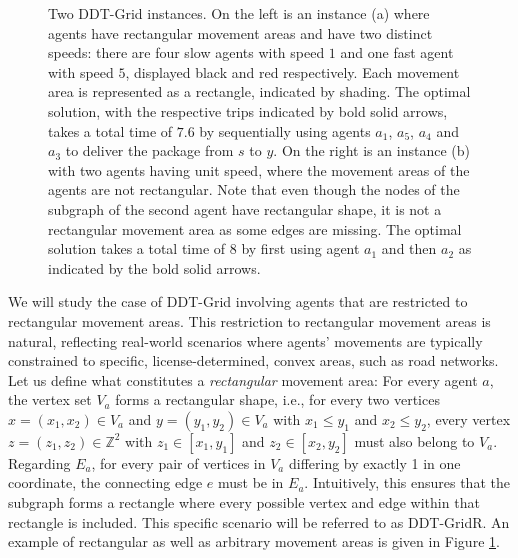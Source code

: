 \begin{figure}[ht]
    \centering
    
    \caption{Two DDT-Grid instances. On the left is an instance (a) where agents have rectangular movement areas and have two distinct speeds: %
    there are four slow agents with speed $1$ and one fast agent with speed $5$, displayed black and red respectively. Each movement area is represented as a rectangle, indicated by shading. 
   The optimal solution, with the respective trips indicated by bold solid arrows, takes a total time of $7.6$ by sequentially using agents $a_1 $, $ a_5$, $a_4$ and $ a_3$ to deliver the package from $s$ to $y$. %
   On the right is an instance (b) with two agents having unit speed, where the movement areas of the agents are not rectangular.
    Note that even though the nodes of the subgraph of the second agent have rectangular shape, it is not a rectangular movement area as some edges are missing. The optimal solution takes a total time of $8$ by first using agent $a_1$ and then $a_2$ as indicated by the bold solid arrows.}
    \label{fig:rectangular_example}
\end{figure}

We will study the case of DDT-Grid involving agents that are restricted to rectangular movement areas. 
This restriction to rectangular movement areas is natural, reflecting real-world scenarios where agents' movements are typically constrained to specific, license-determined, convex areas, such as road networks.  
Let us define what constitutes a \emph{rectangular} movement area: For every agent $a$, the vertex set $V_a$ forms a rectangular shape, i.e., for every two vertices $x=(x_1,x_2) \in V_a$ and $y=(y_1,y_2)\in V_a$ with $x_1\leq y_1$ and $x_2\leq y_2$, every vertex $z=(z_1,z_2) \in \mathbb{Z}^2$ with $z_1 \in [x_1,y_1]$ and $z_2\in [x_2,y_2]$ must also belong to $V_a$. Regarding $E_a$, for every pair of vertices in $V_a$ differing by exactly 1 in one coordinate, the connecting edge $e$ must be in $E_a$. Intuitively, this ensures that the subgraph forms a rectangle where every possible vertex and edge within that rectangle is included.  This specific scenario will be referred to as DDT-GridR.  
An example of rectangular as well as arbitrary movement areas is given in Figure \ref{fig:rectangular_example}.  

